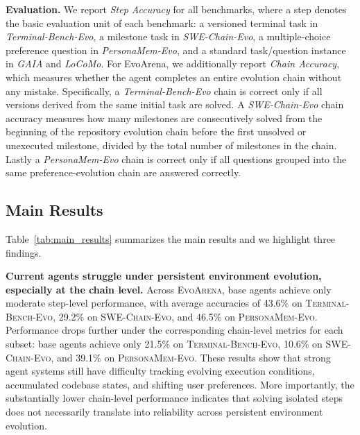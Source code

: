 \documentclass{llmxive}
\begin{document}
\textbf{Evaluation.} \quad
We report \emph{Step Accuracy} for all benchmarks, where a step denotes the basic evaluation unit of each benchmark: a versioned terminal task in \emph{Terminal-Bench-Evo}, a milestone task in \emph{SWE-Chain-Evo}, a multiple-choice preference question in \emph{PersonaMem-Evo}, and a standard task/question instance in \emph{GAIA} and \emph{LoCoMo}. 
For EvoArena, we additionally report \emph{Chain Accuracy}, which measures whether the agent completes an entire evolution chain without any mistake. Specifically, a \emph{Terminal-Bench-Evo} chain is correct only if all versions derived from the same initial task are solved. A \emph{SWE-Chain-Evo} chain accuracy measures how many milestones are consecutively solved from the beginning of the repository evolution chain before the first unsolved or unexecuted milestone, divided by the total number of milestones in the chain. Lastly a \emph{PersonaMem-Evo} chain is correct only if all questions grouped into the same preference-evolution chain are answered correctly.



\subsection{Main Results}
\label{sec:main_results}

Table~\ref{tab:main_results} summarizes the main results and we highlight three findings.


\textbf{Current agents struggle under persistent environment evolution, especially at the chain level.}
Across \textsc{EvoArena}, base agents achieve only moderate step-level performance, with average accuracies of 43.6\% on \textsc{Terminal-Bench-Evo}, 29.2\% on \textsc{SWE-Chain-Evo}, and 46.5\% on \textsc{PersonaMem-Evo}. Performance drops further under the corresponding chain-level metrics for each subset: base agents achieve only 21.5\% on \textsc{Terminal-Bench-Evo}, 10.6\% on \textsc{SWE-Chain-Evo}, and 39.1\% on \textsc{PersonaMem-Evo}. These results show that strong agent systems still have difficulty tracking evolving execution conditions, accumulated codebase states, and shifting user preferences. More importantly, the substantially lower chain-level performance indicates that solving isolated steps does not necessarily translate into reliability across persistent environment evolution.
\end{document}
